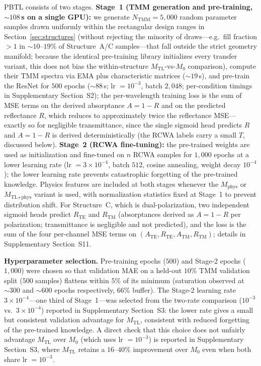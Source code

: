 \documentclass[a4paper,fleqn]{cas-sc}
\newcommand{\Mzero}{M_0}
\newcommand{\Mphys}{M_\text{phys}}
\newcommand{\Mtl}{M_\text{TL}}
\newcommand{\Mtlphys}{M_\text{TL+phys}}
\begin{document}
PBTL consists of two stages. \textbf{Stage~1 (TMM generation and pre-training, ${\sim}108$\,s on a single GPU):} we generate $N_\text{TMM}=5{,}000$ random parameter samples drawn uniformly within the rectangular design ranges in Section~\ref{sec:structures} (without rejecting the minority of draws---e.g.\ fill fraction $>1$ in ${\sim}10$--$19\%$ of Structure~A/C samples---that fall outside the strict geometry manifold; because the identical pre-training library initializes every transfer variant, this does not bias the within-structure $\Mtl$-vs-$\Mzero$ comparison), compute their TMM spectra via EMA plus characteristic matrices (${\sim}19$\,s), and pre-train the ResNet for $500$ epochs (${\sim}88$\,s; lr $= 10^{-3}$, batch $2{,}048$; per-condition timings in Supplementary Section~S2); the per-wavelength training loss is the sum of MSE terms on the derived absorptance $A=1-R$ and on the predicted reflectance $R$, which reduces to approximately twice the reflectance MSE---exactly so for negligible transmittance, since the single sigmoid head predicts $R$ and $A=1-R$ is derived deterministically (the RCWA labels carry a small $T$, discussed below). \textbf{Stage~2 (RCWA fine-tuning):} the pre-trained weights are used as initialization and fine-tuned on $n$ RCWA samples for $1{,}000$ epochs at a lower learning rate (lr $=3\times10^{-4}$, batch $512$, cosine annealing, weight decay $10^{-4}$); the lower learning rate prevents catastrophic forgetting of the pre-trained knowledge. Physics features are included at both stages whenever the $\Mphys$ or $\Mtlphys$ variant is used, with normalization statistics fixed at Stage~1 to prevent distribution shift. For Structure~C, which is dual-polarization, two independent sigmoid heads predict $R_\text{TE}$ and $R_\text{TM}$ (absorptances derived as $A=1-R$ per polarization; transmittance is negligible and not predicted), and the loss is the sum of the four per-channel MSE terms on $(A_\text{TE}, R_\text{TE}, A_\text{TM}, R_\text{TM})$; details in Supplementary Section~S11.

\textbf{Hyperparameter selection.} Pre-training epochs ($500$) and Stage-2 epochs ($1{,}000$) were chosen so that validation MAE on a held-out $10\%$ TMM validation split ($500$ samples) flattens within $5\%$ of its minimum (saturation observed at ${\sim}300$ and ${\sim}600$ epochs respectively, $66\%$ buffer). The Stage-2 learning rate $3\times10^{-4}$---one third of Stage~1---was selected from the two-rate comparison ($10^{-3}$ vs.\ $3\times10^{-4}$) reported in Supplementary Section~S3: the lower rate gives a small but consistent validation advantage for $\Mtl$, consistent with reduced forgetting of the pre-trained knowledge. A direct check that this choice does not unfairly advantage $\Mtl$ over $\Mzero$ (which uses lr $=10^{-3}$) is reported in Supplementary Section~S3, where $\Mtl$ retains a $16$--$40\%$ improvement over $\Mzero$ even when both share lr $=10^{-3}$.
\end{document}
